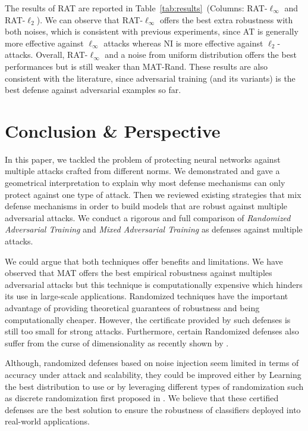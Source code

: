The results of RAT are reported in Table~\ref{tab:results}~(Columns: RAT-$\ell_\infty$ and RAT-$\ell_2$).
We can observe that RAT-$\ell_\infty$ offers the best extra robustness with both noises, which is consistent with previous experiments, since AT is generally more effective against $\ell_\infty$ attacks whereas NI is more effective against $\ell_2$-attacks. Overall, RAT-$\ell_\infty$ and a noise from uniform distribution offers the best performances but is still weaker than MAT-Rand.
These results are also consistent with the literature, since adversarial training (and its variants) is the best defense against adversarial examples so far.


\section{Conclusion \& Perspective}
In this paper, we tackled the problem of protecting neural networks against multiple attacks crafted from different norms. We demonstrated and gave a geometrical interpretation to explain why most defense mechanisms can only protect against one type of attack. Then we reviewed existing strategies that mix defense mechanisms in order to build models that are robust against multiple adversarial attacks. We conduct a rigorous and full comparison of {\em Randomized Adversarial Training} and {\em Mixed Adversarial Training} as defenses against multiple attacks. 

We could argue that both techniques offer benefits and limitations. We have observed that MAT offers the best empirical robustness against multiples adversarial attacks but this technique is computationally expensive which hinders its use in large-scale applications. Randomized techniques have the important advantage of providing theoretical guarantees of robustness and being computationally cheaper. However, the certificate provided by such defenses is still too small for strong attacks. Furthermore, certain Randomized defenses also suffer from the curse of dimensionality as recently shown by \cite{kumar2020curse}. 

Although, randomized defenses based on noise injection seem limited in terms of accuracy under attack and scalability, they could be improved either by Learning the best distribution to use or by leveraging different types of randomization such as discrete randomization first proposed in \cite{pinot2020randomization}. We believe that these certified defenses are the best solution to ensure the robustness of classifiers deployed into real-world applications. 



